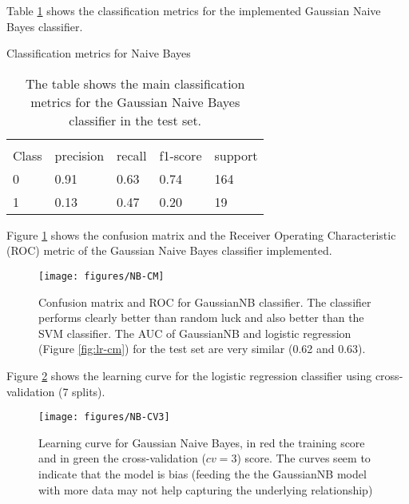 \documentclass[11pt]{article}
\theoremstyle{definition}
\theoremstyle{remark}
\begin{document}
Table \ref{tab:naive} shows the classification metrics for the implemented Gaussian Naive Bayes classifier.
\begin{table}[H]
\caption{Classification metrics for Naive Bayes} 
\begin{center} 
\begin{tabular}{lllll}
\hline
\multicolumn{1}{c}{} \\
Class & precision & recall & f1-score & support     \\
\hline
0 & 0.91  &    0.63   &   0.74   &    164 \\
1 & 0.13  &    0.47   &   0.20   &    19 \\
\hline
\end{tabular}
\caption{The table shows the main classification metrics for the Gaussian Naive Bayes classifier in the test set.} \label{tab:naive} 
\end{center}
\end{table}

Figure \ref{fig:nb-cm} shows the confusion matrix and the Receiver Operating Characteristic (ROC) metric of the Gaussian Naive Bayes classifier implemented.
\begin{figure}[H]
        \centering
        \texttt{[image: figures/NB-CM]}
        \caption{Confusion matrix and ROC for GaussianNB classifier. The classifier performs clearly better than random luck and also better than the SVM classifier. The AUC of GaussianNB and logistic regression (Figure \ref{fig:lr-cm}) for the test set  are very similar (0.62 and 0.63).} \label{fig:nb-cm}
\end{figure}

Figure \ref{fig:nb-cv3} shows the learning curve for the logistic regression classifier using cross-validation (7 splits).
\begin{figure}[H]
        \centering
        \texttt{[image: figures/NB-CV3]}
        \caption{Learning curve for Gaussian Naive Bayes, in red the training score and in green the cross-validation ($cv=3$) score. The curves seem to indicate that the model is bias (feeding the the GaussianNB model with more data may not help capturing the underlying relationship)
        } \label{fig:nb-cv3}
\end{figure}
\end{document}
